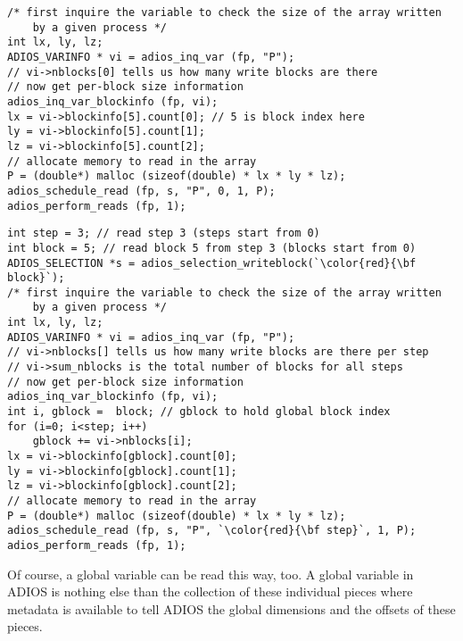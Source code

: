 \begin{lstlisting}[numbers=none, 
                   frame=T,
                   caption={Read an array written by one specific process, with first checking the size},  
                   label=code:localread2]
/* first inquire the variable to check the size of the array written
    by a given process */
int lx, ly, lz;
ADIOS_VARINFO * vi = adios_inq_var (fp, "P");
// vi->nblocks[0] tells us how many write blocks are there
// now get per-block size information
adios_inq_var_blockinfo (fp, vi);
lx = vi->blockinfo[5].count[0]; // 5 is block index here
ly = vi->blockinfo[5].count[1];
lz = vi->blockinfo[5].count[2];
// allocate memory to read in the array
P = (double*) malloc (sizeof(double) * lx * ly * lz);
adios_schedule_read (fp, s, "P", 0, 1, P);
adios_perform_reads (fp, 1);  
\end{lstlisting}

\begin{lstlisting}[numbers=none, 
                   frame=T,
                   caption={Read an array written by one specific process, when multiple steps are in a file},  
                   label=code:localread3]
int step = 3; // read step 3 (steps start from 0)
int block = 5; // read block 5 from step 3 (blocks start from 0)
ADIOS_SELECTION *s = adios_selection_writeblock(`\color{red}{\bf block}`); 
/* first inquire the variable to check the size of the array written
    by a given process */
int lx, ly, lz;
ADIOS_VARINFO * vi = adios_inq_var (fp, "P");
// vi->nblocks[] tells us how many write blocks are there per step
// vi->sum_nblocks is the total number of blocks for all steps
// now get per-block size information
adios_inq_var_blockinfo (fp, vi);
int i, gblock =  block; // gblock to hold global block index
for (i=0; i<step; i++)
    gblock += vi->nblocks[i];
lx = vi->blockinfo[gblock].count[0];
ly = vi->blockinfo[gblock].count[1];
lz = vi->blockinfo[gblock].count[2];
// allocate memory to read in the array
P = (double*) malloc (sizeof(double) * lx * ly * lz);
adios_schedule_read (fp, s, "P", `\color{red}{\bf step}`, 1, P);
adios_perform_reads (fp, 1);  
\end{lstlisting}


\noindent Of course, a global variable can be read this way, too. A global variable in ADIOS is nothing else than the collection of these individual pieces where metadata is available to tell ADIOS the global dimensions and the offsets of these pieces.





